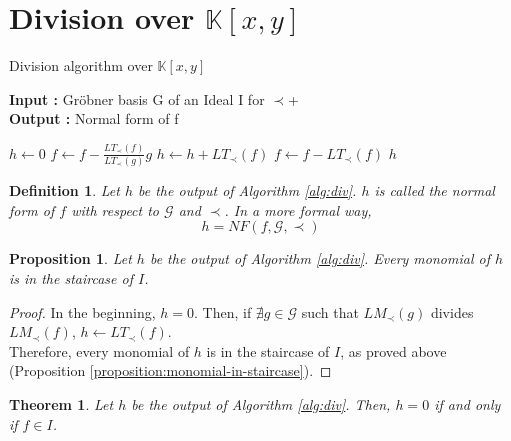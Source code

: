 \documentclass{article}
\newtheorem{theorem}{Theorem}[section]
\newtheorem{definition}{Definition}[section]
\newtheorem{proposition}{Proposition}[section]
\begin{document}
\section{Division over $\mathbb{K}[x, y]$}

\begin{algorithm}
\caption{Division algorithm over $\mathbb{K}[x, y]$} \label{alg:div}
\textbf{Input : }Gröbner basis G of an Ideal I for $\prec$+ \\
\textbf{Output : }Normal form of f
\begin{algorithmic}
    \State $h \gets 0$
            \State $f \gets f- \displaystyle \frac{LT_{\prec}(f)}{LT_{\prec}(g)}g$
        \Else
            \State $h \gets h + LT_{\prec}(f)$
            \State $f \gets f - LT_{\prec}(f)$
        \EndIf
    \EndWhile
    \State \Return $h$
\end{algorithmic}
\end{algorithm}

\begin{definition}
    Let $h$ be the output of Algorithm \ref{alg:div}. $h$ is called the normal form of $f$ with respect to $\mathscr{G}$ and $\prec$. In a more formal way, 
    \begin{displaymath}
        h = NF(f, \mathscr{G}, \prec)
    \end{displaymath}
\end{definition}

\begin{proposition} \label{proposition:monomials-h-staircase}
    Let $h$ be the output of Algorithm \ref{alg:div}. Every monomial of $h$ is in the staircase of $I$.
\end{proposition}
    
\begin{proof}
    In the beginning, $h = 0$. Then, if $\nexists g \in \mathscr{G}$ such that $LM_{\prec}(g)$ divides $LM_{\prec}(f)$, $h \gets LT_{\prec}(f)$. \\
    Therefore, every monomial of $h$ is in the staircase of $I$, as proved above (Proposition \ref{proposition:monomial-in-staircase}). 
\end{proof}

\begin{theorem}
    Let $h$ be the output of Algorithm \ref{alg:div}. Then, $h = 0$ if and only if $f \in I$.
\end{theorem}
\end{document}
